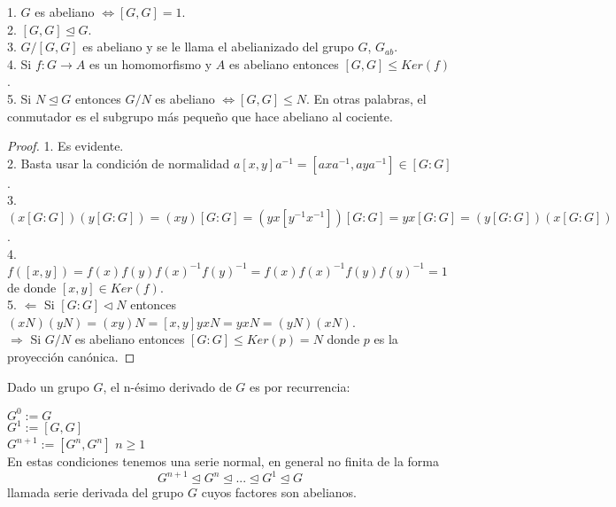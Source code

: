 \begin{nprop}
1. $G$ es abeliano $\iff [G,G] = 1$.\\
2. $[G,G] \trianglelefteq G$.\\
3. $G/[G,G]$ es abeliano y se le llama el abelianizado del grupo $G$, $G_{ab}$.\\
4. Si $f:G \rightarrow A$ es un homomorfismo y $A$ es abeliano entonces $[G,G] \le Ker(f)$.\\
5. Si $N \trianglelefteq G$ entonces $G/N$ es abeliano $\iff [G,G] \le N$. En otras palabras, el conmutador es el subgrupo más pequeño que hace abeliano al cociente.
\end{nprop}
\begin{proof}
1. Es evidente.\\
2. Basta usar la condición de normalidad $a[x,y]a^{-1} = [axa^{-1},aya^{-1}] \in [G:G]$.\\
3. $(x[G:G])(y[G:G]) = (xy)[G:G] = (yx[y^{-1}x^{-1}])[G:G] = yx[G:G] = (y[G:G])(x[G:G])$.\\
4. $f([x,y]) = f(x)f(y)f(x)^{-1}f(y)^{-1} = f(x)f(x)^{-1}f(y)f(y)^{-1} = 1$ de donde $[x,y] \in Ker(f)$.\\
5. $\Leftarrow$ Si $[G:G] \triangleleft N$ entonces $(xN)(yN)=(xy)N=[x,y]yxN=yxN = (yN)(xN)$.\\
$\Rightarrow$ Si $G/N$ es abeliano entonces $[G:G] \le Ker(p) = N$ donde $p$ es la proyección canónica.
\end{proof}

\begin{ndef}
Dado un grupo $G$, el n-ésimo derivado de $G$ es por recurrencia:

$G^{0}:= G$\\
$G^{1}:= [G,G]$\\
$G^{n+1}:=[G^{n},G^{n}]$ $n \ge 1$\\

En estas condiciones tenemos una serie normal, en general no finita de la forma $$G^{n+1} \trianglelefteq G^{n} \trianglelefteq ... \trianglelefteq G^{1} \trianglelefteq G$$ llamada serie derivada del grupo $G$ cuyos factores son abelianos.
\end{ndef}

